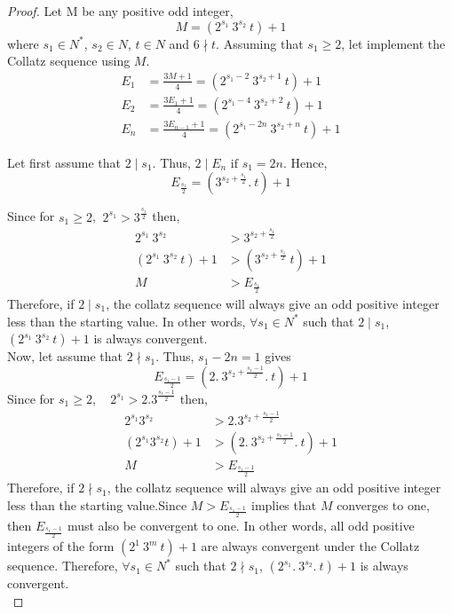 \documentclass[14pt,a4paper]{article}
\theoremstyle{plain}
\begin{document}
\begin{proof}
    Let M be any positive odd integer, 
    \begin{equation}
        M = (2^{s_{1}}~3^{s_{2}}~t) +1 
    \end{equation}
    where $s_{1} \in N^{*}$, $s_{2} \in N$, $t \in N $ and $6\nmid t$. Assuming that $s_{1} \geq 2$, let implement the Collatz sequence using $M$.
    \begin{align}
        E_{1} &= \frac{3M+1}{4}= (2^{s_{1}-2}~3^{s_{2}+ 1}~t) + 1
        \\
        E_{2} &= \frac{3E_{1}+1}{4} = (2^{s_{1}-4}~3^{s_{2}+ 2}~t) + 1 
        \\
        E_{n} &= \frac{3E_{n-1}+1}{4} = (2^{s_{1}-2n}~3^{s_{2}+ n}~t) + 1
    \end{align}
    
    Let first assume that $2 \mid s_{1}$. Thus, $ 2 \mid E_{n} \text{ if } s_{1} = 2n$. Hence, 
    \begin{equation}
        E_{\frac{s_{1}}{2}} = (3^{s_{2}+\frac{s_{1}}{2}}.~t) + 1 
    \end{equation}
    
     Since for $s_{1}\geq 2$, $~2^{s_{1}} > 3^{\frac{s_{1}}{2}}$ then, 
    \begin{align}
        2^{s_{1}}~3^{s_{2}} &> 3^{s_{2}+\frac{s_{1}}{2}} \\
        (2^{s_{1}}~3^{s_{2}}~t)+1 &> (3^{s_{2}+\frac{s_{1}}{2}}~t)+1 \\
        M &> E_{\frac{s_{1}}{2}}
    \end{align}
    Therefore, if $2\mid s_{1}$, the collatz sequence will always give an odd positive integer less than the starting value. In other words, $\forall s_{1} \in N^{*}$ such that $2\mid s_{1}$, $(2^{s_{1}}~3^{s_{2}}~t)+1$ is always convergent.\\ 
    
    Now, let assume that $2\nmid s_{1}$. Thus, $s_{1}-2n=1$ gives
    \begin{equation}
        E_{\frac{s_{1}-1}{2}} = (2.~3^{s_{2}+\frac{s_{1}-1}{2}}.~t)+1
    \end{equation}
    Since for $s_{1}\geq 2$, ~ $2^{s_{1}}> 2.3^{\frac{s_{1}-1}{2}}$ then,
    \begin{align}
        2^{s_{1}}3^{s_{2}} &> 2.3^{s_{2}+\frac{s_{1}-1}{2}} \\
        (2^{s_{1}}3^{s_{2}}t)+1 &> (2.~3^{s_{2}+\frac{s_{1}-1}{2}}.~t)+1\\
        M &> E_{\frac{s_{1}-1}{2}}
    \end{align}
    Therefore, if $2\nmid s_{1}$, the collatz sequence will always give an odd positive integer less than the starting value.Since $ M > E_{\frac{s_{1}-1}{2}}$ implies that $M$ converges to one, then $E_{\frac{s_{1}-1}{2}}$  must also be convergent to one. In other words, all odd positive integers of the form $(2^{1}~3^{m}~t)+1$ are always convergent under the Collatz sequence. Therefore, $\forall s_{1} \in N^{*}$ such that $2\nmid s_{1}$, $(2^{s_{1}}.~3^{s_{2}}.~t)+1$ is always convergent.\\
\end{proof}
\end{document}
